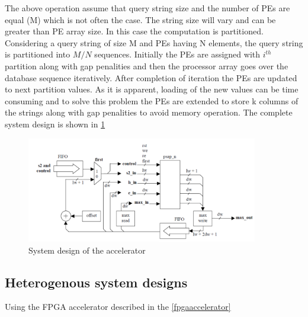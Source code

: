 \documentclass[12pt,twoside]{article}
\begin{document}
The above operation assume that query string size and the number of PEs are equal (M) which is not often the case. The string size will vary and 
can be greater than PE array size. In this case the computation is partitioned. Considering a query string of size M and PEs having N elements,
the query string is partitioned into $ M/N $ sequences. Initially the PEs are assigned with $ i^{th} $ partition along with gap penalities and
then the processor array goes over the database sequence iteratively. After completion of iteration the PEs are updated to next partition values.
As it is apparent, loading of the new values can be time consuming and to solve this problem the PEs are extended to store k columns of the strings along
with gap penalities to avoid memory operation. The complete system design is shown in \cref{fig:systemdesign} 

\begin{figure}%
    \centering
    \includegraphics[width=0.9\textwidth]{fig/systemdesign}
    \caption{System design of the accelerator \cite[Figure 4]{oliver_hyper_2005}}
    \label{fig:systemdesign}
\end{figure}

\subsection{Heterogenous system designs}

Using the FPGA accelerator described in the \cref{fpgaaccelerator}
\end{document}
